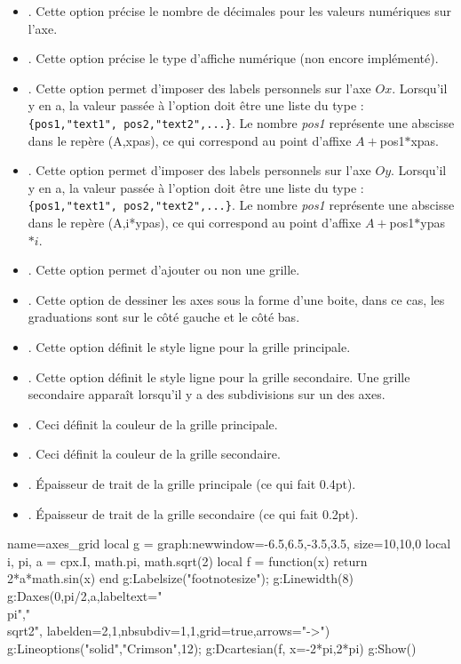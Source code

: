 \documentclass[%
10pt,%
a4paper,%
french,%
]%
{article}%
\newenvironment*{demo}[2][]{%
\gdef\legende{#2}%
\gdef\lab{#1}%
\bgroup
\VerbatimOut{\jobname.tmp}%
}%
{%
\endVerbatimOut%
\egroup%
\inputminted[ignorelexererrors=true,breaklines,bgcolor=Beige,linenos,numbersep=6pt,frame=single,fontsize=\footnotesize]{Lua}{\jobname.tmp}%
\begin{minipage}{0.9\textwidth}
\begin{center}
\captionof{figure}{\legende}\label{\lab}%
%
\end{center}
\end{minipage}
}
\begin{document}
\begin{itemize}
\begin{itemize}
            \item {}. Cette option précise le nombre de décimales pour les valeurs numériques sur l'axe.
            \item {}. Cette option précise le type d'affiche numérique (non encore implémenté).
            \item {}. Cette option permet d'imposer des labels personnels sur l'axe $Ox$. Lorsqu'il y en a, la valeur passée à l'option doit être une liste du type : \verb|{pos1,"text1", pos2,"text2",...}|. Le nombre \emph{pos1} représente une abscisse dans le repère (A,xpas), ce qui correspond au point d'affixe $A+$pos1$*$xpas.
            \item {}. Cette option permet d'imposer des labels personnels sur l'axe $Oy$. Lorsqu'il y en a, la valeur passée à l'option doit être une liste du type : \verb|{pos1,"text1", pos2,"text2",...}|. Le nombre \emph{pos1} représente une abscisse dans le repère (A,i*ypas), ce qui correspond au point d'affixe $A+$pos1$*$ypas$*i$.
            \item {}. Cette option permet d'ajouter ou non une grille.
            \item {}. Cette option de dessiner les axes sous la forme d'une boite, dans ce cas, les graduations sont sur le côté gauche et le côté bas.
            \item {}. Cette option définit le style ligne pour la grille principale.
            \item {}. Cette option définit le style ligne pour la grille secondaire. Une grille secondaire apparaît lorsqu'il y a des subdivisions sur un des axes.
            \item  {}. Ceci définit la couleur de la grille principale.
            \item {}. Ceci définit la couleur de la grille secondaire.
            \item {}. Épaisseur de trait de la grille principale (ce qui fait 0.4pt).
            \item {}. Épaisseur de trait de la grille secondaire (ce qui fait 0.2pt).
        \end{itemize}
\end{itemize}

\begin{demo}{Exemple avec axes avec grille}
\begin{luadraw}{name=axes_grid}
local g = graph:new{window={-6.5,6.5,-3.5,3.5}, size={10,10,0}}
local i, pi, a = cpx.I, math.pi, math.sqrt(2)
local f = function(x) return 2*a*math.sin(x) end
g:Labelsize("footnotesize"); g:Linewidth(8)
g:Daxes({0,pi/2,a},{labeltext={"\\pi","\\sqrt{2}"}, labelden={2,1},nbsubdiv={1,1},grid=true,arrows="->"})
g:Lineoptions("solid","Crimson",12); g:Dcartesian(f, {x={-2*pi,2*pi}})
g:Show()
\end{luadraw}
\end{demo}
\end{document}
